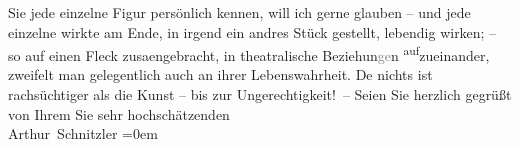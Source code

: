 \begin{ledgroupsized}[t]{13cm}
                    Sie jede einzelne Figur persönlich kennen, {\pb}will ich
                    gerne glauben – und jede einzelne wirkte am Ende, in irgend ein andres Stück
                    gestellt, lebendig wirken; – so auf einen Fleck zusa{\geminationm}engebracht, in theatralische Beziehun\textcolor{gray}{ge}n \substVorne{}\textsuperscript{auf}\substDazwischen{}zu\substHinten{}einander, zweifelt man gelegentlich auch an ihrer Lebenswahrheit. De{\geminationn} nichts ist rachsüchtiger als die Kunst – bis zur
                    Ungerechtigkeit! –\pend
           \pstart
           Seien Sie herzlich gegrüßt von Ihrem Sie sehr hochschätzenden{\\[\baselineskip]}\spacefill\mbox{Arthur Schnitzler}\pend
           \leftskip=0em{}
         
         \endnumbering{}\end{ledgroupsized}  \newcommand{\dateiname}{L02213}\newcommand{\titel}{Arthur Schnitzler an Robert Adam, 11. 7. 1915}\newcommand{\editorInnen}{Martin Anton Müller und Gerd-Hermann Susen}
      